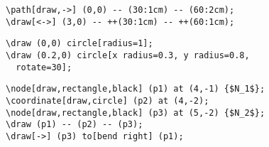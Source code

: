 \begin{frame}[fragile]
  \begin{verbatim}
\path[draw,->] (0,0) -- (30:1cm) -- (60:2cm);
\draw[<->] (3,0) -- ++(30:1cm) -- ++(60:1cm);
  \end{verbatim}
  \begin{center}
  \end{center}
\end{frame}

\begin{frame}[fragile]
  \begin{verbatim}
\draw (0,0) circle[radius=1];
\draw (0.2,0) circle[x radius=0.3, y radius=0.8,
  rotate=30];
  \end{verbatim}
  \begin{center}
  \end{center}
\end{frame}

\begin{frame}[fragile]
  \begin{verbatim}
\node[draw,rectangle,black] (p1) at (4,-1) {$N_1$};
\coordinate[draw,circle] (p2) at (4,-2);
\node[draw,rectangle,black] (p3) at (5,-2) {$N_2$};
\draw (p1) -- (p2) -- (p3);
\draw[->] (p3) to[bend right] (p1);
  \end{verbatim}
  \begin{center}
  \end{center}
\end{frame}

